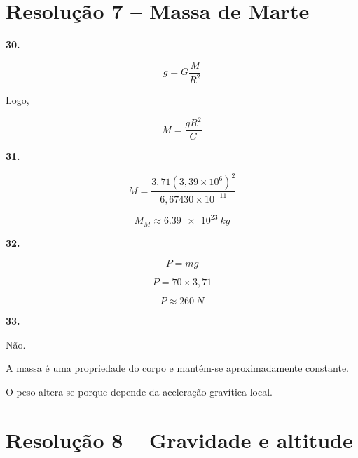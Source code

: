 \documentclass[11pt,a4paper]{article}
\begin{document}
	\section*{Resolução 7 -- Massa de Marte}
	
	\begin{solucaobox}[Questões 30--33]
		
		\textbf{30.}
		
		\[
		g=
		G\frac{M}{R^2}
		\]
		
		Logo,
		
		\[
		\boxed{
			M=
			\frac{gR^2}{G}
		}
		\]
		
		\vspace{3mm}
		
		\textbf{31.}
		
		\[
		M=
		\frac{
			3{,}71(3{,}39\times10^6)^2
		}{
			6{,}67430\times10^{-11}
		}
		\]
		
		\[
		\boxed{
			M_M\approx\SI{6.39e23}{kg}
		}
		\]
		
		\vspace{3mm}
		
		\textbf{32.}
		
		\[
		P=mg
		\]
		
		\[
		P=70\times3{,}71
		\]
		
		\[
		\boxed{
			P\approx\SI{260}{N}
		}
		\]
		
		\vspace{3mm}
		
		\textbf{33.}
		
		Não.
		
		A massa é uma propriedade do corpo e mantém-se aproximadamente constante.
		
		O peso altera-se porque depende da aceleração gravítica local.
		
	\end{solucaobox}
	
	\section*{Resolução 8 -- Gravidade e altitude}
	
\end{document}
